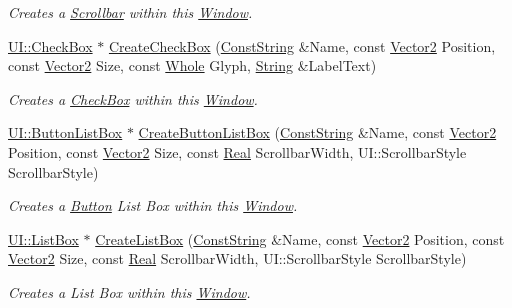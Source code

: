 \begin{DoxyCompactItemize}
\begin{DoxyCompactList}\small\item\em Creates a \hyperlink{classphys_1_1UI_1_1Scrollbar}{Scrollbar} within this \hyperlink{classphys_1_1UI_1_1Window}{Window}. \item\end{DoxyCompactList}\item 
\hyperlink{classphys_1_1UI_1_1CheckBox}{UI::CheckBox} $\ast$ \hyperlink{classphys_1_1UI_1_1Window_af0d9c9d8795ed9b8239dee779aba62ab}{CreateCheckBox} (\hyperlink{namespacephys_a5ce5049f8b4bf88d6413c47b504ebb31}{ConstString} \&Name, const \hyperlink{classphys_1_1Vector2}{Vector2} Position, const \hyperlink{classphys_1_1Vector2}{Vector2} Size, const \hyperlink{namespacephys_a460f6bc24c8dd347b05e0366ae34f34a}{Whole} Glyph, \hyperlink{namespacephys_aa03900411993de7fbfec4789bc1d392e}{String} \&LabelText)
\begin{DoxyCompactList}\small\item\em Creates a \hyperlink{classphys_1_1UI_1_1CheckBox}{CheckBox} within this \hyperlink{classphys_1_1UI_1_1Window}{Window}. \item\end{DoxyCompactList}\item 
\hyperlink{classphys_1_1UI_1_1ButtonListBox}{UI::ButtonListBox} $\ast$ \hyperlink{classphys_1_1UI_1_1Window_a236c65069633c605a71623993e8ad68e}{CreateButtonListBox} (\hyperlink{namespacephys_a5ce5049f8b4bf88d6413c47b504ebb31}{ConstString} \&Name, const \hyperlink{classphys_1_1Vector2}{Vector2} Position, const \hyperlink{classphys_1_1Vector2}{Vector2} Size, const \hyperlink{namespacephys_af7eb897198d265b8e868f45240230d5f}{Real} ScrollbarWidth, UI::ScrollbarStyle ScrollbarStyle)
\begin{DoxyCompactList}\small\item\em Creates a \hyperlink{classphys_1_1UI_1_1Button}{Button} List Box within this \hyperlink{classphys_1_1UI_1_1Window}{Window}. \item\end{DoxyCompactList}\item 
\hyperlink{classphys_1_1UI_1_1ListBox}{UI::ListBox} $\ast$ \hyperlink{classphys_1_1UI_1_1Window_a4bb271eb2307dd1b223c4b009f75e02f}{CreateListBox} (\hyperlink{namespacephys_a5ce5049f8b4bf88d6413c47b504ebb31}{ConstString} \&Name, const \hyperlink{classphys_1_1Vector2}{Vector2} Position, const \hyperlink{classphys_1_1Vector2}{Vector2} Size, const \hyperlink{namespacephys_af7eb897198d265b8e868f45240230d5f}{Real} ScrollbarWidth, UI::ScrollbarStyle ScrollbarStyle)
\begin{DoxyCompactList}\small\item\em Creates a List Box within this \hyperlink{classphys_1_1UI_1_1Window}{Window}. \item\end{DoxyCompactList}\end{DoxyCompactItemize}
